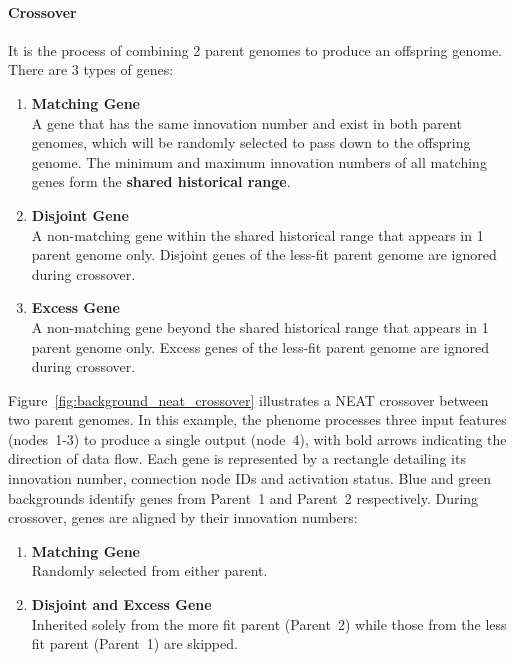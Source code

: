 \paragraph{Crossover}
It is the process of combining 2 parent genomes to produce an offspring genome. There are 3 types of genes: 
\begin{enumerate}
    \item \textbf{Matching Gene} \\
    A gene that has the same innovation number and exist in both parent genomes, which will be randomly selected to pass down to the offspring genome. The minimum and maximum innovation numbers of all matching genes form the \textbf{shared historical range}. 

    \item \textbf{Disjoint Gene} \\
    A non-matching gene within the shared historical range that appears in 1 parent genome only. Disjoint genes of the less-fit parent genome are ignored during crossover. 

    \item \textbf{Excess Gene} \\
    A non-matching gene beyond the shared historical range that appears in 1 parent genome only. Excess genes of the less-fit parent genome are ignored during crossover. 
\end{enumerate}

Figure~\ref{fig:background_neat_crossover} illustrates a NEAT crossover between two parent genomes. In this example, the phenome processes three input features (nodes~1-3) to produce a single output (node~4), with bold arrows indicating the direction of data flow. 
Each gene is represented by a rectangle detailing its innovation number, connection node IDs and activation status. Blue and green backgrounds identify genes from Parent~1 and Parent~2 respectively. 
During crossover, genes are aligned by their innovation numbers: 
\begin{enumerate}
    \item \textbf{Matching Gene} \\
    Randomly selected from either parent. 

    \item \textbf{Disjoint and Excess Gene} \\
    Inherited solely from the more fit parent (Parent~2) while those from the less fit parent (Parent~1) are skipped. 
\end{enumerate}

